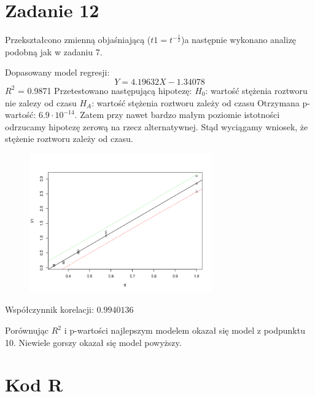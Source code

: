\documentclass[9pt]{article}  %
\begin{document}
\section{Zadanie 12}

    Przekształcono zmienną objaśniającą ($t1 = t^{-\frac{1}{2}}$)a następnie wykonano analizę podobną jak w zadaniu 7. \newline

  Dopasowany model regresji:
  $$ Y = 4.19632X  - 1.34078 $$
  $R^2$ = 0.9871   \newline
  Przetestowano następującą hipotezę: \newline
  $H_0$: wartość stężenia roztworu nie zalezy od czasu \newline
  $H_A$: wartość stężenia roztworu zależy od czasu \newline
  Otrzymana p-wartość: $6.9 \cdot 10^{-14}$. \newline
  Zatem przy nawet bardzo małym poziomie istotności odrzucamy hipotezę zerową na rzecz alternatywnej. Stąd wyciągamy wniosek, że stężenie roztworu zależy od czasu. 


    \begin{figure}[H]
      \centering
      \includegraphics[width=0.7\textwidth]{12.png}
      \caption {}
    \end{figure} 
    Współczynnik korelacji: $0.9940136$
    
Porównując $R^2$ i p-wartości najlepszym modelem okazał się model z podpunktu 10. Niewiele gorszy okazał się model powyższy.
  \section{Kod R}
\end{document}
